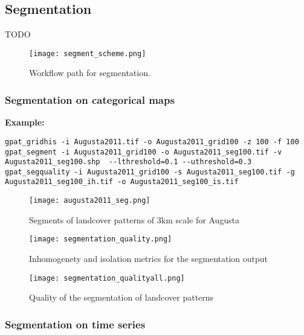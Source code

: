 \FloatBarrier

\subsection{Segmentation}

TODO
\begin{figure}[H]
	\centering
	\texttt{[image: segment\_scheme.png]}
	\caption{Workflow path for segmentation.}
	\label{FIG:SEGMENT}
\end{figure}

\subsubsection{Segmentation on categorical maps}

{\bf Example:}

\begin{minipage}{\linewidth}
\begin{lstlisting}
gpat_gridhis -i Augusta2011.tif -o Augusta2011_grid100 -z 100 -f 100
gpat_segment -i Augusta2011_grid100 -o Augusta2011_seg100.tif -v Augusta2011_seg100.shp  --lthreshold=0.1 --uthreshold=0.3
gpat_segquality -i Augusta2011_grid100 -s Augusta2011_seg100.tif -g Augusta2011_seg100_ih.tif -o Augusta2011_seg100_is.tif
\end{lstlisting}
\end{minipage}

\begin{figure}[H]
	\centering
	\texttt{[image: augusta2011\_seg.png]}
	\caption{Segments of landcover patterns of 3km scale for Augusta}
	\label{FIG:SEG1}
\end{figure}

\begin{figure}[H]
	\centering
	\texttt{[image: segmentation\_quality.png]}
	\caption{Inhomogenety and isolation metrics for the segmentation output}
	\label{FIG:SEG2}
\end{figure}

\begin{figure}[H]
	\centering
	\texttt{[image: segmentation\_qualityall.png]}
	\caption{Quality of the segmentation of landcover patterns}
	\label{FIG:SEG3}
\end{figure}


\FloatBarrier

\subsubsection{Segmentation on time series}


